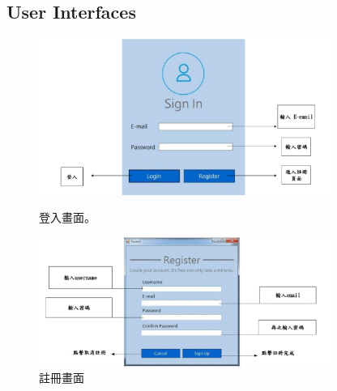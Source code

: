 \documentclass{scrreprt}
\begin{document}
\begin{CJK}{UTF8}{bkai}
\section{User Interfaces}
\begin{figure}[h]
	\centering
	\includegraphics[width=0.85\textwidth]{signin.pdf}
	\caption{登入畫面。}
	\centering
	\includegraphics[width=0.85\textwidth]{register.pdf}
	\caption{註冊畫面}
\end{figure}


\end{CJK}
\end{document}
